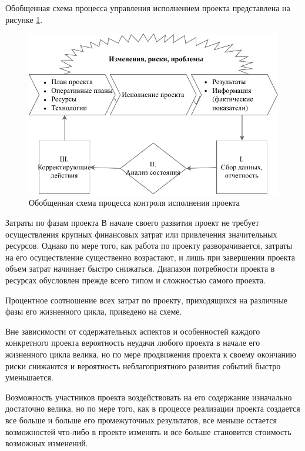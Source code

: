 Обобщенная схема процесса управления исполнением проекта представлена на рисунке \ref{fig:ris7}.
\begin{figure}[!h]
	\centering
	\includegraphics[width=\linewidth]{control}
	\caption{Обобщенная схема процесса контроля исполнения проекта}
	\label{fig:ris7}
\end{figure}

Затраты по фазам проекта
В начале своего развития проект не требует осуществления крупных финансовых затрат или привлечения значительных ресурсов. Однако по мере того, как работа по проекту разворачивается, затраты на его осуществление существенно возрастают, и лишь при завершении проекта объем затрат начинает быстро снижаться. Диапазон потребности проекта в ресурсах обусловлен прежде всего типом и сложностью самого проекта.

Процентное соотношение всех затрат по проекту, приходящихся на различные фазы его жизненного цикла, приведено на схеме.

Вне зависимости от содержательных аспектов и особенностей каждого конкретного проекта вероятность неудачи любого проекта в начале его жизненного цикла велика, но по мере продвижения проекта к своему окончанию риски снижаются и вероятность неблагоприятного развития событий быстро уменьшается.

Возможность участников проекта воздействовать на его содержание изначально достаточно велика, но по мере того, как в процессе реализации проекта создается все больше и больше его промежуточных результатов, все меньше остается возможностей что-либо в проекте изменять и все больше становится стоимость возможных изменений.